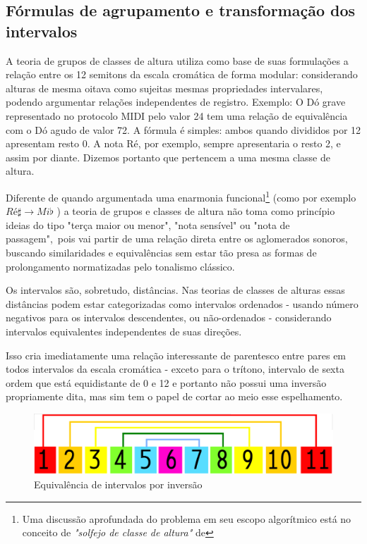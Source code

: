 \documentclass[
	12pt,				%
	openright,			%
	twoside,			%
	a4paper,			%
	english,			%
	french,				%
	spanish,			%
	brazil				%
	]{abntex2}
\begin{document}
\begin{apendicesenv}

\partapendices


\chapter{Fórmulas de agrupamento e transformação dos intervalos}
\label{pos_tonal}

A teoria de grupos de classes de altura utiliza como base de suas formulações a relação entre os 12 semitons da escala cromática de forma modular: considerando alturas de mesma oitava como sujeitas mesmas propriedades intervalares, podendo argumentar relações independentes de registro. Exemplo: O Dó grave representado no protocolo MIDI pelo valor 24 tem uma relação de equivalência com o Dó agudo de valor 72. A fórmula é simples: ambos quando divididos por 12 apresentam resto 0. A nota Ré, por exemplo, sempre apresentaria o resto 2, e assim por diante. Dizemos portanto que pertencem a uma mesma classe de altura.

Diferente de quando argumentada uma enarmonia funcional\footnote{Uma discussão aprofundada do problema em seu escopo algorítmico está no conceito de \textit{"solfejo de classe de altura"} de } (como por exemplo  $Ré\sharp \to Mi\flat$ ) a teoria de grupos e classes de altura não toma como princípio ideias do tipo "terça maior ou menor", "nota sensível" ou "nota de passagem",\ pois vai partir de uma relação direta entre os aglomerados sonoros, buscando similaridades e equivalências sem estar tão presa as formas de prolongamento normatizadas pelo tonalismo clássico. \cite{lerdahl1989atonal,straus1987problem}

Os intervalos são, sobretudo, distâncias. Nas teorias de classes de alturas essas distâncias podem estar categorizadas como intervalos ordenados - usando número negativos para os intervalos descendentes, ou não-ordenados - considerando intervalos equivalentes independentes de suas direções. \cite[p. 6]{straus2004}

Isso cria imediatamente uma relação interessante de parentesco entre pares em todos intervalos da escala cromática - exceto para o trítono, intervalo de sexta ordem que está equidistante de 0 e 12 e portanto não possui uma inversão propriamente dita, mas sim tem o papel de cortar ao meio esse espelhamento.

\begin{figure}[!h]
	\caption{\label{fig_grafico}Equivalência de intervalos por inversão }
	\begin{center}
	    \includegraphics[scale=0.3]{algo/equivalencia_inversa.png}
	\end{center}
\end{figure}



\end{apendicesenv}
\end{document}
